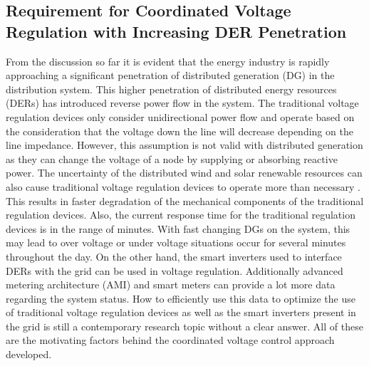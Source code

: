 \subsection{Requirement for Coordinated Voltage Regulation with Increasing DER Penetration}
From the discussion so far it is evident that the energy industry is rapidly approaching a significant penetration of distributed generation (DG) in the distribution system. This higher penetration of distributed energy resources (DERs) has introduced reverse power flow in the system. The traditional voltage regulation devices only consider unidirectional power flow and operate based on the consideration that the voltage down the line will decrease depending on the line impedance. However, this assumption is not valid with distributed generation as they can change the voltage of a node by supplying or absorbing reactive power. The uncertainty of the distributed wind and solar renewable resources can also cause traditional voltage regulation devices to operate more than necessary \cite{int1}. This results in faster degradation of the mechanical components of the traditional regulation devices. Also, the current response time for the traditional regulation devices is in the range of minutes. With fast changing DGs on the system, this may lead to over voltage or under voltage situations occur for several minutes throughout the day. On the other hand, the smart inverters used to interface DERs with the grid can be used in voltage regulation. Additionally advanced metering architecture (AMI) and smart meters can provide a lot more data regarding the system status. How to efficiently use this data to optimize the use of traditional voltage regulation devices as well as the smart inverters present in the grid is still a contemporary research topic without a clear answer. All of these are the motivating factors behind the coordinated voltage control approach developed.


